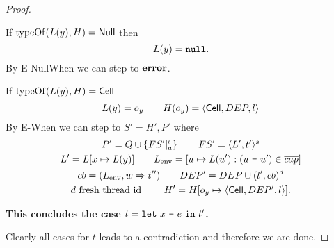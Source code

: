 \begin{proof}
\begin{description}
\begin{description}
          If $\mbox{$\mathrm{typeOf}$}(L(y), H) = \mbox{$\mathsf{Null}$}$ then
          \begin{equation*}
            L(y) = \mbox{\mdseries\texttt{null}}.
          \end{equation*}
          By {\sc E-NullWhen} we can step to $\mbox{{\bf error}}$. \contradiction

          If $\mbox{$\mathrm{typeOf}$}(L(y), H) = \mbox{$\mathsf{Cell}$}$
          \begin{equation*}
            L(y) = o_y  \quad\quad H(o_y) = \mbox{$\langle \mbox{$\mathsf{Cell}$}{}, DEP, l \rangle$}
          \end{equation*}
          By {\sc E-When} we can step to $S' = H', P'$ where
          \begin{equation*}
            \begin{gathered}
              P' = Q \cup \left\{FS'|_a^\iota \right\} \quad\quad FS' = \mbox{$\langle L',
              t' \rangle^s$} \\
              L' = L[x \mapsto L(y)] \quad\quad L_{\text{env}} = [u \mapsto L(u'):
              (\mbox{\mdseries$u$~\texttt{=}~$u'$}) \in \overline{cap}] \\
              cb = ( L_{\text{env}}, w \Rightarrow t'' ) \quad\quad DEP' = DEP
              \cup (l', cb)^d \\
              d \text{ fresh thread id } \quad\quad H' = H[o_y \mapsto \mbox{$\langle \mbox{$\mathsf{Cell}$}{}, DEP',
              l \rangle$}].
            \end{gathered}
          \end{equation*}
          \contradiction
      \end{description}
      {\bf This concludes the case $t = \mbox{\mdseries\texttt{let}~$x$~\texttt{=}~$e$~\texttt{in}~$t'$}$.}
  \end{description}
  Clearly all cases for $t$ leads to a contradiction and therefore we are done.
\end{proof}








